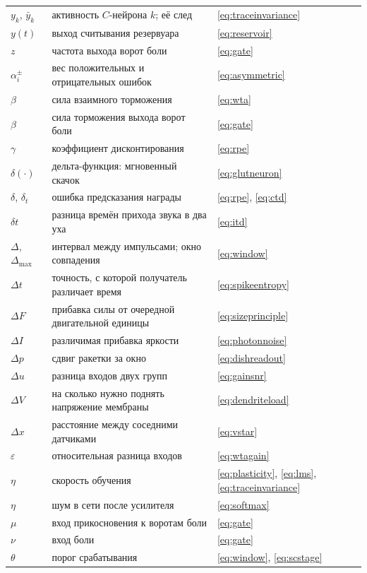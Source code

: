 \begin{center}
\begin{longtable}{>{\raggedright}p{2.0cm}>{\raggedright}p{9.6cm}>{\raggedright\arraybackslash}p{2.4cm}}
$y_k$, $\bar y_k$ & активность $C$-нейрона $k$; её след & \eqref{eq:traceinvariance} \\
$y(t)$ & выход считывания резервуара & \eqref{eq:reservoir} \\
$z$ & частота выхода ворот боли & \eqref{eq:gate} \\
\midrule
$\alpha_i^\pm$ & вес положительных и отрицательных ошибок & \eqref{eq:asymmetric} \\
$\beta$ & сила взаимного торможения & \eqref{eq:wta} \\
$\beta$ & сила торможения выхода ворот боли & \eqref{eq:gate} \\
$\gamma$ & коэффициент дисконтирования & \eqref{eq:rpe} \\
$\delta(\cdot)$ & дельта-функция: мгновенный скачок & \eqref{eq:glutneuron} \\
$\delta$, $\delta_t$ & ошибка предсказания награды & \eqref{eq:rpe}, \eqref{eq:ctd} \\
$\delta t$ & разница времён прихода звука в два уха & \eqref{eq:itd} \\
$\Delta$, $\Delta_{\max}$ & интервал между импульсами; окно совпадения & \eqref{eq:window} \\
$\Delta t$ & точность, с которой получатель различает время & \eqref{eq:spikeentropy} \\
$\Delta F$ & прибавка силы от очередной двигательной единицы & \eqref{eq:sizeprinciple} \\
$\Delta I$ & различимая прибавка яркости & \eqref{eq:photonnoise} \\
$\Delta p$ & сдвиг ракетки за окно & \eqref{eq:dishreadout} \\
$\Delta u$ & разница входов двух групп & \eqref{eq:gainsnr} \\
$\Delta V$ & на сколько нужно поднять напряжение мембраны & \eqref{eq:dendriteload} \\
$\Delta x$ & расстояние между соседними датчиками & \eqref{eq:vstar} \\
$\varepsilon$ & относительная разница входов & \eqref{eq:wtagain} \\
$\eta$ & скорость обучения & \eqref{eq:plasticity}, \eqref{eq:lms}, \eqref{eq:traceinvariance} \\
$\eta$ & шум в сети после усилителя & \eqref{eq:softmax} \\
$\mu$ & вход прикосновения к воротам боли & \eqref{eq:gate} \\
$\nu$ & вход боли & \eqref{eq:gate} \\
$\theta$ & порог срабатывания & \eqref{eq:window}, \eqref{eq:scstage} \\

\end{longtable}
\end{center}
